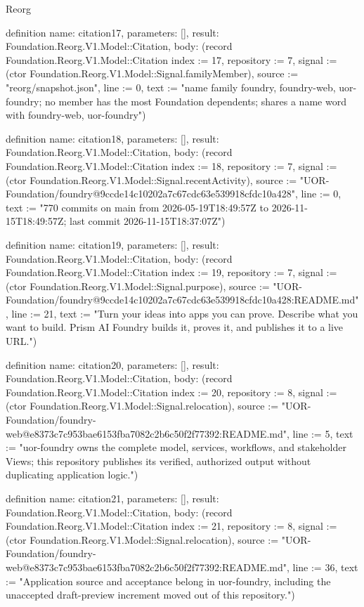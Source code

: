 \begin{lexlean}{Reorg}
\begin{semanticmodule}
definition{
  name: citation17,
  parameters: [],
  result: Foundation.Reorg.V1.Model::Citation,
  body: (record Foundation.Reorg.V1.Model::Citation {index := 17, repository := 7, signal := (ctor Foundation.Reorg.V1.Model::Signal.familyMember), source := "reorg/snapshot.json", line := 0, text := "name family {foundry, foundry-web, uor-foundry}; no member has the most Foundation dependents; shares a name word with foundry-web, uor-foundry"})
}

definition{
  name: citation18,
  parameters: [],
  result: Foundation.Reorg.V1.Model::Citation,
  body: (record Foundation.Reorg.V1.Model::Citation {index := 18, repository := 7, signal := (ctor Foundation.Reorg.V1.Model::Signal.recentActivity), source := "UOR-Foundation/foundry@9ccde14c10202a7c67cdc63e539918cfdc10a428", line := 0, text := "770 commits on main from 2026-05-19T18:49:57Z to 2026-11-15T18:49:57Z; last commit 2026-11-15T18:37:07Z"})
}

definition{
  name: citation19,
  parameters: [],
  result: Foundation.Reorg.V1.Model::Citation,
  body: (record Foundation.Reorg.V1.Model::Citation {index := 19, repository := 7, signal := (ctor Foundation.Reorg.V1.Model::Signal.purpose), source := "UOR-Foundation/foundry@9ccde14c10202a7c67cdc63e539918cfdc10a428:README.md", line := 21, text := "Turn your ideas into apps you can prove. Describe what you want to build. Prism AI Foundry builds it, proves it, and publishes it to a live URL."})
}

definition{
  name: citation20,
  parameters: [],
  result: Foundation.Reorg.V1.Model::Citation,
  body: (record Foundation.Reorg.V1.Model::Citation {index := 20, repository := 8, signal := (ctor Foundation.Reorg.V1.Model::Signal.relocation), source := "UOR-Foundation/foundry-web@e8373c7c953bae6153fba7082c2b6c50f2f77392:README.md", line := 5, text := "uor-foundry owns the complete model, services, workflows, and stakeholder Views; this repository publishes its verified, authorized output without duplicating application logic."})
}

definition{
  name: citation21,
  parameters: [],
  result: Foundation.Reorg.V1.Model::Citation,
  body: (record Foundation.Reorg.V1.Model::Citation {index := 21, repository := 8, signal := (ctor Foundation.Reorg.V1.Model::Signal.relocation), source := "UOR-Foundation/foundry-web@e8373c7c953bae6153fba7082c2b6c50f2f77392:README.md", line := 36, text := "Application source and acceptance belong in uor-foundry, including the unaccepted draft-preview increment moved out of this repository."})
}


\end{semanticmodule}
\end{lexlean}
